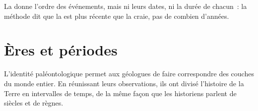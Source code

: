La  donne l'ordre des événements, mais ni leurs dates, ni
la durée de chacun~: la méthode dit que la  est plus récente que la
craie, pas de combien d'années.

\section{Ères et périodes}

L'identité paléontologique permet aux géologues de faire correspondre des
couches du monde entier. En réunissant leurs observations, ils ont divisé
l'histoire de la Terre en intervalles de temps, de la même façon que les
historiens parlent de siècles et de règnes.

